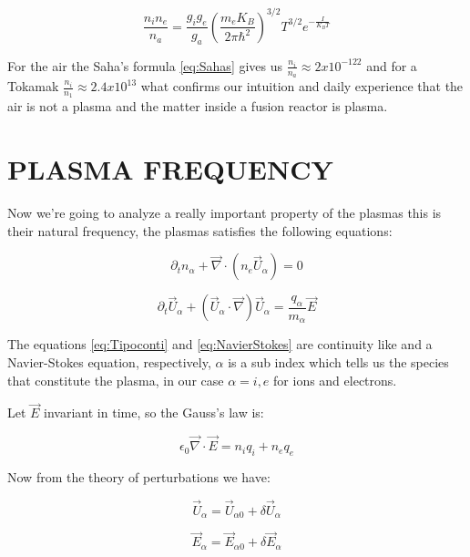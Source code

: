 \documentclass[spanish,notitlepage,letterpaper,11pt]{article} %
\numberwithin{equation}{subsection}
\begin{document}
    \begin{equation}\label{eq:Sahas}
        \frac{n_in_e}{n_a} = \frac{g_ig_e}{g_a}\left(\frac{m_eK_B}{2\pi\hbar^2}\right)^{3/2}T^{3/2}e^{-\frac{I}{K_BT}}
    \end{equation}

    For the air the Saha's formula \ref{eq:Sahas} gives us $\frac{n_i}{n_a}\approx 2x10^{-122}$ and for a Tokamak $\frac{n_i}{n_1}\approx 2.4x10^{13}$ what confirms our intuition and daily experience that the air is not a plasma and the matter inside a fusion reactor is plasma.

\section{PLASMA FREQUENCY}
    Now we're going to analyze a really important property of the plasmas this is their natural frequency, the plasmas satisfies the following equations:

    \begin{equation}\label{eq:Tipoconti}
        \partial_tn_{\alpha} + \Vec{\nabla} \cdot (n_{e}\Vec{U}_{\alpha}) = 0
    \end{equation}

    \begin{equation}\label{eq:NavierStokes}
        \partial_t\Vec{U}_{\alpha} + (\Vec{U}_{\alpha}\cdot\Vec{\nabla})\Vec{U}_{\alpha} = \frac{q_{\alpha}}{m_{\alpha}}\Vec{E}
    \end{equation}

    The equations \ref{eq:Tipoconti} and \ref{eq:NavierStokes} are continuity like and a Navier-Stokes equation, respectively, $\alpha$ is a sub index which tells us the species that constitute the plasma, in our case $\alpha = i,e$ for ions and electrons.

    Let $\Vec{E}$ invariant in time, so the Gauss's law is:

    \begin{equation}\label{eq:GaussLaw}
        \epsilon_0 \Vec{
        \nabla}\cdot \Vec{E} = n_iq_i + n_eq_e
    \end{equation}

    Now from the theory of perturbations we have:

    \begin{equation}
        \Vec{U}_{\alpha} = \Vec{U}_{\alpha 0} + \delta \Vec{U}_{\alpha}
    \end{equation}

    \begin{equation}
        \Vec{E}_{\alpha} = \Vec{E}_{\alpha 0} + \delta\Vec{E}_{\alpha}
    \end{equation}
\end{document}
